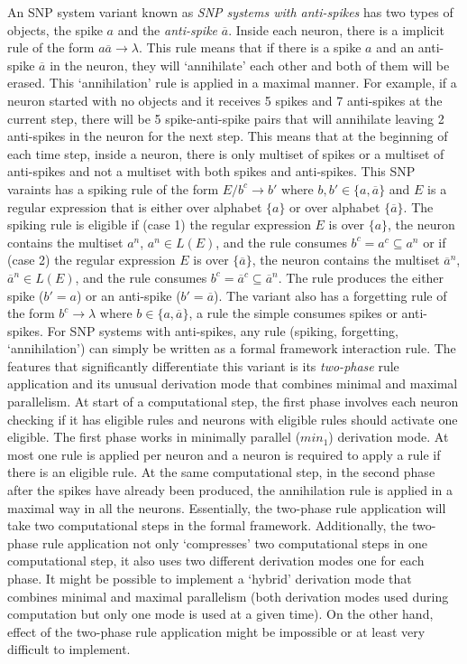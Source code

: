 \documentclass[a4paper]{article}
\theoremstyle{definition}
\newcommand{\ra}{\rightarrow}
\begin{document}
An SNP system variant known as \emph{SNP systems with anti-spikes} \cite{pan-2009-anti-spikes} has
two types of objects, the spike $a$ and the \emph{anti-spike} $\overline{a}$. Inside each neuron,
there is a implicit rule of the form $a\overline{a} \ra \lambda$. This rule means that if there is
a spike $a$ and an anti-spike $\overline{a}$ in the neuron, they will `annihilate' each other and
both of them will be erased. This `annihilation' rule is applied in a maximal manner. For example,
if a neuron started with no objects and it receives 5 spikes and 7 anti-spikes at the current step,
there will be 5 spike-anti-spike pairs that will annihilate leaving 2 anti-spikes in the neuron for
the next step. This means that at the beginning of each time step, inside a neuron, there is only 
multiset of spikes or a multiset of anti-spikes and not a multiset with both spikes and anti-spikes.
This SNP varaints has a spiking rule of the form $E/b^c \ra b'$ where $b,b' \in \{a,\overline{a}\}$ 
and $E$ is a regular expression that is either over alphabet $\{a\}$ or over alphabet 
$\{\overline{a}\}$. The spiking rule is eligible if (case 1) the regular expression $E$ is over $\{a\}$, 
the neuron contains the multiset $a^n$, $a^n \in L(E)$, and the rule consumes 
$b^c = a^c \subseteq a^n$ or if (case 2) the regular expression $E$ is over $\{\overline{a}\}$, the
neuron contains the multiset $\overline{a}^n$, $\overline{a}^n \in L(E)$, and the rule consumes
$b^c = \overline{a}^c \subseteq \overline{a}^n$. The rule produces the either spike ($b'= a$) or
an anti-spike ($b'=\overline{a}$). The variant also has a forgetting rule of the form $b^c \ra 
\lambda$ where $b \in \{a,\overline{a}\}$, a rule the simple consumes spikes or anti-spikes. For SNP 
systems with anti-spikes, any rule (spiking, forgetting, `annihilation') can simply be written as a 
formal framework interaction rule. The features that significantly differentiate this variant is 
its \emph{two-phase} rule application and its unusual derivation mode that combines minimal and 
maximal parallelism. At start of a computational step, the first phase involves each neuron checking 
if it has eligible rules and neurons with eligible rules should activate one eligible. The first 
phase works in minimally parallel ($min_1$) derivation mode. At most one rule is applied per neuron
and a neuron is required to apply a rule if there is an eligible rule. At the same computational
step, in the second phase after the spikes have already been produced, the annihilation rule is 
applied in a maximal way in all the neurons. Essentially, the two-phase rule application will take 
two computational steps in the formal framework. Additionally, the two-phase rule application not
only `compresses' two computational steps in one computational step, it also uses two different 
derivation modes one for each phase. It might be possible to implement a `hybrid' derivation mode
that combines minimal and maximal parallelism (both derivation modes used during computation but
only one mode is used at a given time). On the other hand, effect of the two-phase rule application 
might be impossible or at least very difficult to implement.
\end{document}
